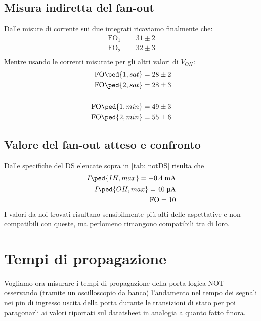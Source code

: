 \documentclass[10pt, a4paper, italian]{article}
\begin{document}
\subsection{Misura indiretta del fan-out}
Dalle misure di corrente sui due integrati ricaviamo finalmente che:
\begin{align*}
    \text{FO}_1 &= 31 \pm 2 \\
    \text{FO}_2 &= 32 \pm 3 \\
\end{align*}
Mentre usando le correnti misurate per gli altri valori di $V_{OH}$:
\begin{align*}
    \text{FO}\ped{1, sat} &= 28 \pm 2 \\
    \text{FO}\ped{2, sat} &= 28 \pm 3 \\
\\
    \text{FO}\ped{1, min} &= 49 \pm 3 \\
    \text{FO}\ped{2, min} &= 55 \pm 6 \\
\end{align*}

\subsection{Valore del fan-out atteso e confronto}
Dalle specifiche del DS elencate sopra in \ref{tab: notDS} risulta che
\begin{align*}
    I\ped{IH, max}= -0.4 \; \si{m\A} \\
    I\ped{OH, max}= 40 \; \si{\micro\A} \\
    \text{FO} = 10
\end{align*}
I valori da noi trovati risultano sensibilmente più alti delle aspettative
e non compatibili con queste, ma perlomeno rimangono compatibili tra di loro.

\section{Tempi di propagazione}
Vogliamo ora misurare i tempi di propagazione della porta logica NOT
osservando (tramite un oscilloscopio da banco) l'andamento nel tempo dei
segnali nei pin di ingresso uscita della porta durante le transizioni di stato
per poi paragonarli ai valori riportati sul datatsheet in analogia a quanto
fatto finora.
\end{document}
